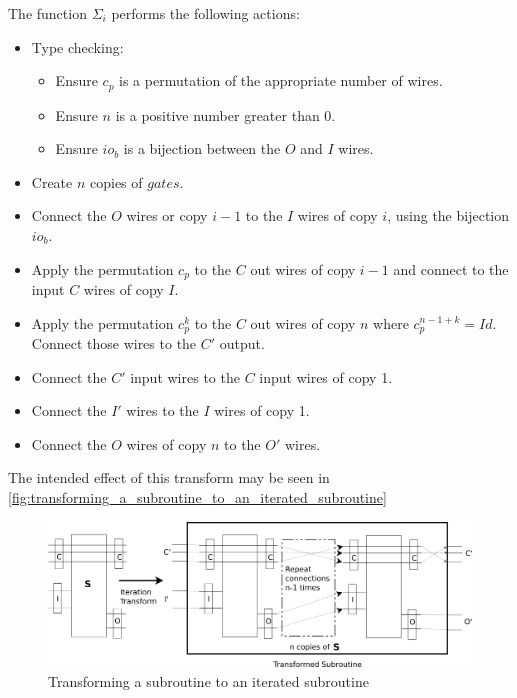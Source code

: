The function $\Sigma_i$ performs the following actions:
\begin{itemize}
  \item Type checking:
  \begin{itemize}
    \item Ensure  $c_p$ is a permutation of the appropriate number of wires.
    \item Ensure $n$ is a positive number greater than 0.
    \item Ensure $io_b$ is a bijection between the $O$ and $I$ wires.
  \end{itemize}
  \item Create $n$ copies of $gates$.
  \item Connect the $O$ wires or copy $i-1$ to the $I$ wires of copy $i$, using the bijection
  $io_b$.
  \item Apply the permutation $c_p$ to the $C$ out wires of copy $i-1$ and connect to the input $C$
  wires of copy $I$.
  \item Apply the permutation $c_p^k$ to the $C$ out wires of copy $n$ where $c_p^{n-1+k} = Id$.
  Connect those wires to the $C'$ output.
  \item Connect the $C'$ input wires to the $C$ input wires of copy 1.
  \item Connect the $I'$ wires to the $I$ wires of copy 1.
  \item Connect the $O$ wires of copy $n$ to the $O'$ wires.
\end{itemize}

The intended effect of this transform may be seen in
\vref{fig:transforming_a_subroutine_to_an_iterated_subroutine}
\begin{figure}[htbp]
  \centering
     \includegraphics[scale=.4]{diagrams/SubroutineIterationTransform.png}
   \caption{Transforming a subroutine to an iterated subroutine}
   \label{fig:transforming_a_subroutine_to_an_iterated_subroutine}
\end{figure}

